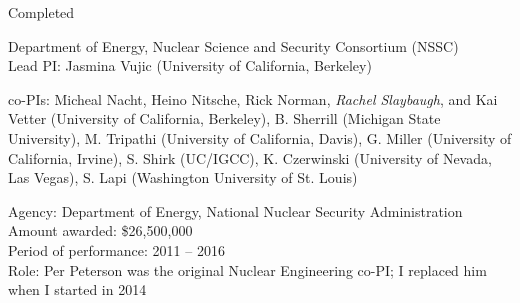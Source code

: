 \begin{rSubsection}{Completed}{}{}{}
\vspace*{0.3 em}
\item Department of Energy, Nuclear Science and Security Consortium (NSSC)\\
Lead PI: Jasmina Vujic (University of California, Berkeley)
\vspace*{-.6 em}
\begin{addmargin}[1em]{0 em}
co-PIs: Micheal Nacht, Heino Nitsche, Rick Norman, \textit{Rachel Slaybaugh}, and Kai Vetter (University of California, Berkeley), B. Sherrill  (Michigan State University), M. Tripathi (University of California, Davis), G. Miller (University of California, Irvine), S. Shirk (UC/IGCC), K. Czerwinski (University of Nevada, Las Vegas), S. Lapi (Washington University of St. Louis)
\end{addmargin}
\vspace*{-.6 em}
Agency:  Department of Energy, National Nuclear Security Administration\\
Amount awarded: \$26,500,000\\
Period of performance: 2011 -- 2016\\
Role: Per Peterson was the original Nuclear Engineering co-PI; I replaced him when I started in 2014
\end{rSubsection}


